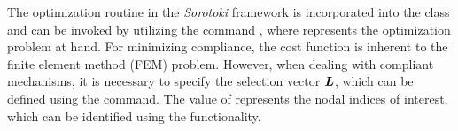 The optimization routine in the \textit{Sorotoki} framework is incorporated into the  class and can be invoked by utilizing the command , where  represents the optimization problem at hand. For minimizing compliance, the cost function is inherent to the finite element method (FEM) problem. However, when dealing with compliant mechanisms, it is necessary to specify the selection vector ${\boldsymbol{L}}$, which can be defined using the  command. The value of  represents the nodal indices of interest, which can be identified using the  functionality.


